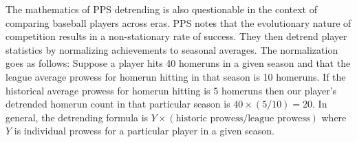 \documentclass[11pt]{article}\usepackage[]{graphicx}\usepackage[]{color}
\begin{document}
The mathematics of PPS detrending is also questionable in the context of 
comparing baseball players across eras. 
PPS notes that the evolutionary nature of competition results in a 
non-stationary rate of success.  They then detrend player 
statistics by normalizing achievements to seasonal averages.  
The normalization goes as follows: 
  Suppose a player hits 40 homeruns in a given season and that the league 
  average prowess for homerun hitting in that season is 10 homeruns. If the 
  historical average prowess for homerun hitting is 5 homeruns then our 
  player's detrended homerun count in that particular season is 
  $40\times(5/10) = 20$.  In general, the detrending formula is 
  $Y \times (\text{historic prowess} / \text{league prowess})$ where $Y$ is 
  individual prowess for a particular player in a given season.
\end{document}
